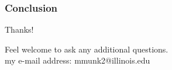 
\begin{frame}
  \frametitle{Conclusion}
  Thanks!

  Feel welcome to ask any additional questions. \\
  my e-mail address: mmunk2@illinois.edu
\end{frame}
